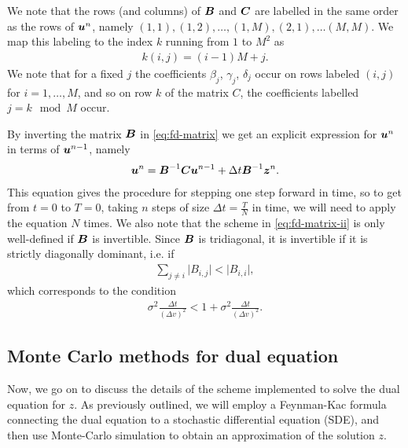 We note that the rows (and columns) of $\boldsymbol{B}$ and $\boldsymbol{C}$ are labelled in the same order as the rows of $\boldsymbol{u}^n$, namely $(1,1),(1,2),\dots,(1,M),(2,1),\dots(M,M)$. We map this labeling to the index $k$ running from $1$ to $M^2$ as 
%
\begin{align}
    k(i,j) = (i-1)M + j.
\end{align}
%
We note that for a fixed $j$ the coefficients $\beta_j$, $\gamma_j$, $\delta_j$ occur on rows labeled $(i,j)$ for $i=1,\dots,M$, and so on row $k$ of the matrix $C$, the coefficients labelled $j = k \mod M$ occur.

By inverting the matrix $\boldsymbol{B}$ in \autoref{eq:fd-matrix} we get an explicit expression for $\boldsymbol{u}^n$ in terms of $\boldsymbol{u}^{n-1}$, namely
%
\begin{align} 
    \label{eq:fd-matrix-ii}
    \boldsymbol{u}^n = \boldsymbol{B}^{-1}\boldsymbol{C}\boldsymbol{u}^{n-1} + \Delta t \boldsymbol{B}^{-1}\boldsymbol{z}^n.
\end{align}
%
This equation gives the procedure for stepping one step forward in time, so to get from $t=0$ to $T=0$, taking $n$ steps of size $\Delta t = \frac{T}{N}$ in time, we will need to apply the equation $N$ times. We also note that the scheme in \autoref*{eq:fd-matrix-ii} is only well-defined if $\boldsymbol{B}$ is invertible. Since $\boldsymbol{B}$ is tridiagonal, it is invertible if it is strictly diagonally dominant, i.e. if
%
\begin{align} 
    \sum_{j\neq i} \lvert B_{i,j} \rvert < \lvert B_{i,i} \rvert,  
\end{align}
%
which corresponds to the condition 
%
\begin{align}
    \sigma^2 \frac{\Delta t}{(\Delta v)^2} < 1 + \sigma^2 \frac{\Delta t}{(\Delta v)^2}.
\end{align}
%

\subsection{Monte Carlo methods for dual equation}

Now, we go on to discuss the details of the scheme implemented to solve the dual equation for $z$. As previously outlined, we will employ a Feynman-Kac formula connecting the dual equation to a stochastic differential equation (SDE), and then use Monte-Carlo simulation to obtain an approximation of the solution $z$.


